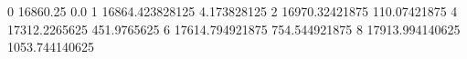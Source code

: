 0 16860.25 0.0
1 16864.423828125 4.173828125
2 16970.32421875 110.07421875
4 17312.2265625 451.9765625
6 17614.794921875 754.544921875
8 17913.994140625 1053.744140625
